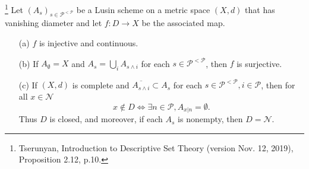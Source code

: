 \begin{proposition}  \label{P:Lusin_sche}
\footnote{
  Tserunyan, Introduction to Descriptive Set Theory (version Nov. 12, 2019), 
  Proposition 2.12, p.10.
}
Let $(A_s)_{s\in \mathcal{P}^{<\mathcal{P}}}$ be a Lusin scheme on a metric
space $(X,d)$ that has vanishing diameter and let $f:D\to X$ be the associated
map. 
\begin{enumerate}
  \item[(a)] $f$ is injective and continuous.
  \item[(b)] If $A_{\emptyset}=X$ and $A_s=\bigcup_i A_{s\wedge i}$
             for each $s\in \mathcal{P}^{<\mathcal{P}}$, then $f$ is surjective.
  \item[(c)] If $(X,d)$ is complete and $\overline{A_{s\wedge i}}\subset A_s$ 
             for each $s\in \mathcal{P}^{<\mathcal{P}}, i\in\mathcal{P}$, then 
             for all $x\in \mathcal{N}$
\[
  x\notin D \iff \exists n\in\mathcal{P}, A_{x|n}=\emptyset.
\]
Thus $D$ is closed, and moreover, if each $A_s$ is nonempty, then
$D=\mathcal{N}$.
\end{enumerate}
\end{proposition}
